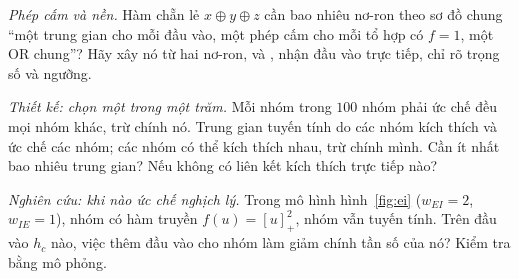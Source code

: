 \begin{exercise}[\lvlB]
\label{ex:03:6}
\emph{Phép cấm và nền.} Hàm chẵn lẻ $x\oplus y\oplus z$ cần bao nhiêu nơ-ron theo sơ đồ chung ``một trung gian  cho mỗi đầu vào, một phép cấm cho mỗi tổ hợp có $f=1$, một OR chung''? Hãy xây nó từ hai nơ-ron,  và , nhận đầu vào trực tiếp, chỉ rõ trọng số và ngưỡng.
\end{exercise}

\begin{exercise}[\lvlC]
\label{ex:03:7}
\emph{Thiết kế: chọn một trong một trăm.} Mỗi nhóm trong $100$ nhóm  phải ức chế đều mọi nhóm khác, trừ chính nó. Trung gian  tuyến tính do các nhóm kích thích và ức chế các nhóm; các nhóm có thể kích thích nhau, trừ chính mình. Cần ít nhất bao nhiêu trung gian? Nếu không có liên kết kích thích trực tiếp nào?
\end{exercise}

\begin{exercise}[\lvlC]
\label{ex:03:8}
\emph{Nghiên cứu: khi nào ức chế nghịch lý.} Trong mô hình hình~\ref{fig:ei} ($w_{EI}=2$, $w_{IE}=1$), nhóm  có hàm truyền $f(u)=[u]_+^2$, nhóm  vẫn tuyến tính. Trên đầu vào $h_c$ nào, việc thêm đầu vào cho nhóm  làm giảm chính tần số của nó? Kiểm tra bằng mô phỏng.
\end{exercise}

